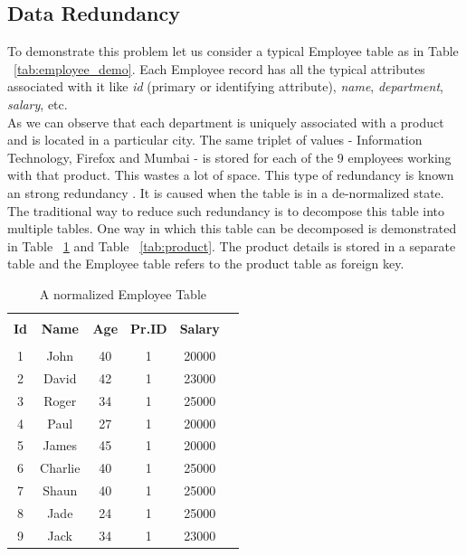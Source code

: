 \documentclass[12pt, oneside]{book}
\begin{document}
\subsection{Data Redundancy}
To demonstrate this problem let us consider a typical Employee table as in Table ~\ref{tab:employee_demo}. Each Employee record has all the typical attributes associated with it like \emph{id} (primary or identifying attribute), \emph{name}, \emph{department}, \emph{salary}, etc. \\
As we can observe that each department is uniquely associated with a product and is located in a particular city. The same triplet of values - Information Technology, Firefox and Mumbai - is stored for each of the 9 employees working with that product. This wastes a lot of space. This type of redundancy is known an strong redundancy \cite{redundancy}. It is caused when the table is in a de-normalized state. The traditional way to reduce such redundancy is to decompose this table into multiple tables. One way in which this table can be decomposed is demonstrated in Table ~\ref{tab:emp_normal} and Table ~\ref{tab:product}. The product details is stored in a separate table and the Employee table refers to the product table as foreign key.

\begin{table}
    \centering
    \begin{tabular}{| c | c | c | c | c | @{}m{0pt}@{}}
    \hline
    \multicolumn{1}{|c|}{} & \multicolumn{1}{c|}{} & \multicolumn{1}{c|}{} & \multicolumn{1}{c|}{} & \multicolumn{1}{c|}{} &  \\
    \multicolumn{1}{|c|}{\textbf{Id}} & \multicolumn{1}{c|}{\textbf{Name}} & \multicolumn{1}{c|}{\textbf{Age}} & \multicolumn{1}{c|}{\textbf{Pr.ID}} & \multicolumn{1}{c|}{\textbf{Salary}} & \\
    \multicolumn{1}{|c|}{} & \multicolumn{1}{c|}{} & \multicolumn{1}{c|}{} & \multicolumn{1}{c|}{} & \multicolumn{1}{c|}{} &  \\
    \hline
    1 & John & 40 & 1 & 20000 & \\ [1ex] \hline
    2 & David & 42 & 1 & 23000 & \\ [1ex] \hline
    3 & Roger & 34 & 1 & 25000 & \\ [1ex] \hline
    4 & Paul & 27 & 1 & 20000 & \\ [1ex] \hline
    5 & James & 45 & 1 & 20000 & \\ [1ex] \hline
    6 & Charlie & 40 & 1 & 25000 & \\ [1ex] \hline
    7 & Shaun & 40 & 1 & 25000 & \\ [1ex] \hline
    8 & Jade & 24 & 1 & 25000 & \\ [1ex] \hline
    9 & Jack & 34 & 1 & 23000 & \\ [1ex] \hline
    \end{tabular}
    \caption{A normalized Employee Table}
    \label{tab:emp_normal}
\end{table}
\end{document}
